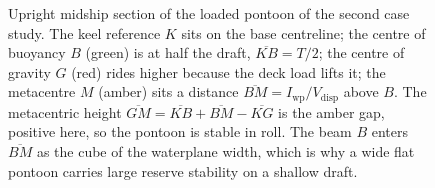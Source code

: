 \begin{figure}[htbp]
\caption[Midship section of a loaded pontoon]{Upright midship section of
the loaded pontoon of the second case study. The keel reference $K$ sits
on the base centreline; the centre of buoyancy $B$ (green) is at half the
draft, $\overline{KB}=T/2$; the centre of gravity $G$ (red) rides higher
because the deck load lifts it; the metacentre $M$ (amber) sits a distance
$\overline{BM}=I_{\mathrm{wp}}/V_{\mathrm{disp}}$ above $B$. The
metacentric height $\overline{GM}=\overline{KB}+\overline{BM}-\overline{KG}$
is the amber gap, positive here, so the pontoon is stable in roll. The
beam $B$ enters $\overline{BM}$ as the cube of the waterplane width, which
is why a wide flat pontoon carries large reserve stability on a shallow
draft.}
\label{fig:vol03ch10:pontoon-section}
\end{figure}
